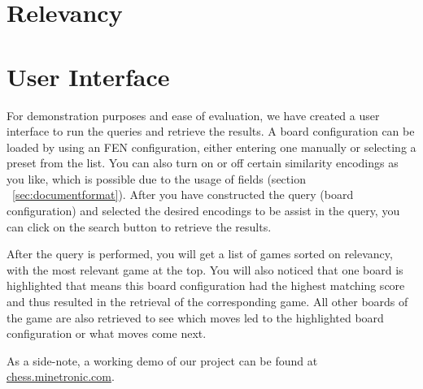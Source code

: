 \documentclass[11pt]{article}
\begin{document}
    \section{Relevancy}




    \section{User Interface}

    For demonstration purposes and ease of evaluation, we have created a user interface to run the queries and retrieve the results. A board configuration can be loaded by using an FEN configuration, either entering one manually or selecting a preset from the list. You can also turn on or off certain similarity encodings as you like, which is possible due to the usage of fields (section ~\ref{sec:documentformat}). After you have constructed the query (board configuration) and selected the desired encodings to be assist in the query, you can click on the search button to retrieve the results.

    After the query is performed, you will get a list of games sorted on relevancy, with the most relevant game at the top. You will also noticed that one board is highlighted that means this board configuration had the highest matching score and thus resulted in the retrieval of the corresponding game. All other boards of the game are also retrieved to see which moves led to the highlighted board configuration or what moves come next.

    As a side-note, a working demo of our project can be found at \href{http://chess.minetronic.com}{chess.minetronic.com}.

    

\end{document}
